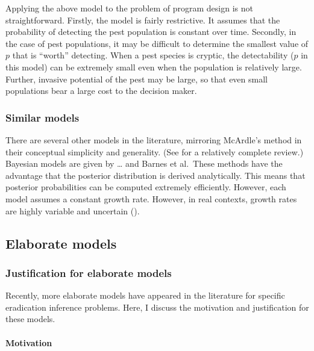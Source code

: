 \documentclass[
]{book}
\begin{document}
Applying the above model to the problem of program design is not straightforward. Firstly, the model is fairly restrictive. It assumes that the probability of detecting the pest population is constant over time. Secondly, in the case of pest populations, it may be difficult to determine the smallest value of \(p\) that is ``worth'' detecting. When a pest species is cryptic, the detectability (\(p\) in this model) can be extremely small even when the population is relatively large. Further, invasive potential of the pest may be large, so that even small populations bear a large cost to the decision maker.

\hypertarget{similar-models}{%
\subsubsection{Similar models}\label{similar-models}}

There are several other models in the literature, mirroring McArdle's method in their conceptual simplicity and generality. (See \citet{boakes2015} for a relatively complete review.) Bayesian models are given by \ldots{} and Barnes et al.~These methods have the advantage that the posterior distribution is derived analytically. This means that posterior probabilities can be computed extremely efficiently. However, each model assumes a constant growth rate. However, in real contexts, growth rates are highly variable and uncertain (\citet{caley2014}).

\hypertarget{elaborate-models}{%
\subsection{Elaborate models}\label{elaborate-models}}

\hypertarget{justification-for-elaborate-models}{%
\subsubsection{Justification for elaborate models}\label{justification-for-elaborate-models}}

Recently, more elaborate models have appeared in the literature for specific eradication inference problems. Here, I discuss the motivation and justification for these models.

\hypertarget{motivation}{%
\paragraph{Motivation}\label{motivation}}
\end{document}
